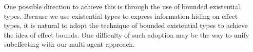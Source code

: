 One possible direction to achieve this is through the use of bounded existential types. Because we use existential types to express information hiding on effect types, it is natural to adopt the technique of bounded existential types to achieve the idea of effect bounds. One difficulty of such adoption may be the way to unify subeffecting with our multi-agent approach.












\begin{comment}
\section{Wyvern with Algebraic Effects hand Handlers}
\todo[inline]{Finish this section}

\subsection{Syntax}
\begin{figure}[htb]
\footnotesize{
\[
\begin{array}{lll}
\begin{array}{lllr}
e & ::= & x \\
& | & l\\
& | & \keyw{new}(x \Rightarrow \overline{d}) \\
& | & [e]_j^\tau\\
& | & e \rhd \tau\\

c & ::= & \m{return} e\\
& | & e.m(e)\\
& | & op(e; y.c)\\
& | & \m{with} h \m{handle} c\\
& | & [c]^\sigma\\
& | &[op]^\varepsilon(e; y.c)


\end{array}
\begin{array}{lllr}
d & ::= & m(x:\tau) = c \\
& |   & \keyw{effect} E =  \varepsilon \\
\varepsilon & ::= & \cdot \mid e.E, \varepsilon \mid op, \varepsilon\\
\tau & ::= & \{ x \Rightarrow \overline{\rho} \} \\
\Gamma & :: = & \varnothing~|~\Gamma,~x : \tau \\
\rho & ::= & m : \tau \rightarrow \sigma \\
       & |   & \keyw{effect} E \\
       & |   & \keyw{effect} E = \varepsilon  \\
\sigma & ::= & \{\varepsilon\}\tau \\
\end{array}
\end{array}
\]
}
\caption{Wyvern's object-oriented core syntax with algebraic effects and handlers}
\label{fig-wyv}
\end{figure}



\end{comment}
